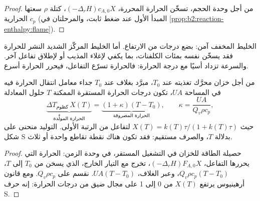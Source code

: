 \begin{proof}
من أجل وحدة الحجم، تسخّن الحرارة المحررة، $(-\Delta_r H)c_{A,0}X$،
كتلة $\rho$ سعتها الحرارية $c_p$ (المبدأ الأول عند ضغط ثابت، والمرحلتان
في \cref{prop:b2:reaction-enthalpy:flame}).
\end{proof}

الخليط المخفف آمن: بضع درجات من الارتفاع. أما الخليط المركّز الشديد
النشر للحرارة فقد يسخّن نفسه بمئات الكلفنات، بما يكفي لإغلاء
المذيب أو لإطلاق تفاعل آخر. والسرعة تزداد أسيًا مع
درجة الحرارة: فالحرارة تسرّع التفاعل، فيحرر الحرارة أسرع.

\begin{proposition}\label{prop:b2:continuous-reactors:steady-states}
من أجل خزان محرَّك تغذيته عند $T_0$، مبرَّد بغلاف عند $T_0$ جداء
معامل انتقال الحرارة فيه في المساحة $UA$، تكون درجات الحرارة
المستقرة الممكنة $T$ حلول المعادلة
\[
  \underbrace{\Delta T_{\text{كظوم}}\,X(T)}_{\text{الحرارة المولَّدة}} =
  \underbrace{(1 + \kappa)(T - T_0)}_{\text{الحرارة المصروفة}}, \qquad
  \kappa = \frac{UA}{Q_v\rho c_p},
\]
حيث $X(T) = k(T)\tau/(1 + k(T)\tau)$ لتفاعل من الرتبة الأولى. التوليد
منحنى على شكل S بدلالة $T$، والصرف مستقيم: فقد تكون هناك نقطة تقاطع
واحدة أو ثلاث.
\end{proposition}

\begin{proof}
حصيلة الطاقة للخزان في التشغيل المستقر، في وحدة الزمن: الحرارة
التي يحررها التفاعل، $(-\Delta_r H)F_{A,0}X$، تخرج مع التيار
الخارج، الذي يسخن من $T_0$ إلى $T$، $Q_v\rho c_p(T - T_0)$، وعبر
الغلاف، $UA(T - T_0)$. نقسم على $Q_v\rho c_p$. ومع قانون أرهينيوس
يرتفع $X(T)$ من 0 إلى 1 على مجال ضيق من درجات الحرارة: إنه حرف S.
\end{proof}

